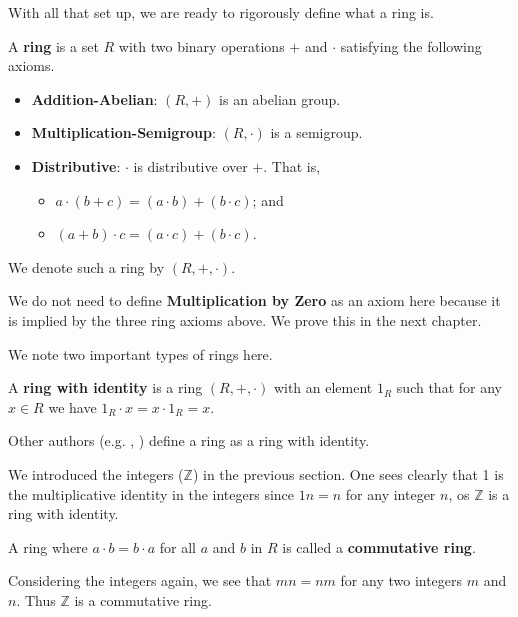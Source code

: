 With all that set up, we are ready to rigorously define what a ring is.
\begin{definition}
    A \textbf{ring} is a set $R$ with two binary operations $+$ and $\cdot$ satisfying the following axioms.
    \begin{itemize}
        \item \textbf{Addition-Abelian}: $(R, +)$ is an abelian group.
        \item \textbf{Multiplication-Semigroup}: $(R, \cdot)$ is a semigroup.
        \item \textbf{Distributive}: $\cdot$ is distributive over $+$. That is,
        \begin{itemize}
            \item $a \cdot (b + c) = (a \cdot b) + (b \cdot c)$; and
            \item $(a + b) \cdot c = (a \cdot c) + (b \cdot c)$.
        \end{itemize}
    \end{itemize}
    We denote such a ring by $(R, +, \cdot)$.
\end{definition}
\begin{remark}
    We do not need to define \textbf{Multiplication by Zero} as an axiom here because it is implied by the three ring axioms above. We prove this in the next chapter.
\end{remark}

We note two important types of rings here.
\begin{definition}
    A \textbf{ring with identity} is a ring $(R, +, \cdot)$ with an element $1_R$ such that for any $x \in R$ we have $1_R \cdot x = x \cdot 1_R = x$.
\end{definition}
\begin{remark}
    Other authors (e.g. \cite[p.~136]{cohn_1982}, \cite[pp.~145--146]{clark_1984}) define a ring as a ring with identity.
\end{remark}
\begin{example}
    We introduced the integers ($\mathbb{Z}$) in the previous section. One sees clearly that 1 is the multiplicative identity in the integers since $1n = n$ for any integer $n$, os $\mathbb{Z}$ is a ring with identity.
\end{example}

\begin{definition}
    A ring where $a \cdot b = b \cdot a$ for all $a$ and $b$ in $R$ is called a \textbf{commutative ring}.
\end{definition}
\begin{example}
    Considering the integers again, we see that $mn = nm$ for any two integers $m$ and $n$. Thus $\mathbb{Z}$ is a commutative ring.
\end{example}

